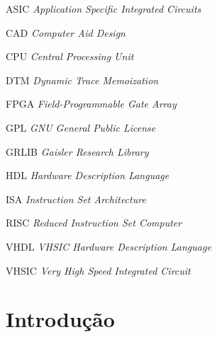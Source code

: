 \documentclass[
	11pt,				%
	openright,			%
	oneside,			%
	a4paper,			%
	english,			%
	french,				%
	spanish,			%
	brazil,				%
	]{abntex2}
\begin{document}
%
\begin{siglas}
  \item[ASIC] \textit{Application Specific Integrated Circuits}%
  \item[CAD] \textit{Computer Aid Design}
  \item[CPU] \textit{Central Processing Unit}%
  \item[DTM] \textit{Dynamic Trace Memoization}%
  \item[FPGA]  \textit{Field-Programmable Gate Array}
  \item[GPL] \textit{GNU General Public License}
  \item[GRLIB] \textit{Gaisler Research Library}
  \item[HDL] \textit{Hardware Description Language}
  \item[ISA] \textit{Instruction Set Architecture}%
  \item[RISC] \textit{Reduced Instruction Set Computer}
  \item[VHDL] \textit{VHSIC Hardware Description Language}
  \item[VHSIC] \textit{Very High Speed Integrated Circuit}
\end{siglas}
%

\tableofcontents*
\cleardoublepage



\textual

\chapter[Introdução]{Introdução}

\end{document}
